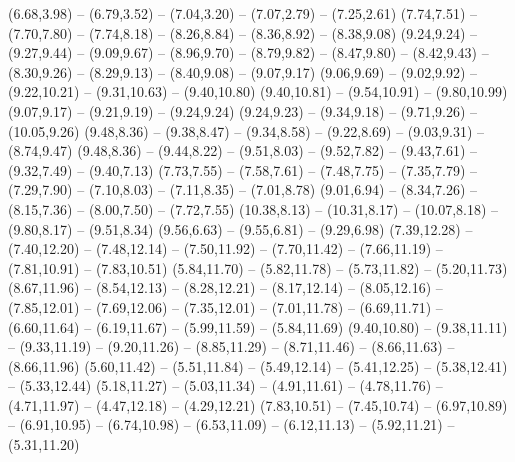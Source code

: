 \expandafter\def\csname geo:Autobahn:A9\endcsname{
  (6.68,3.98) -- (6.79,3.52) -- (7.04,3.20) -- (7.07,2.79) -- (7.25,2.61)
  (7.74,7.51) -- (7.70,7.80) -- (7.74,8.18) -- (8.26,8.84) -- (8.36,8.92) -- (8.38,9.08)}
\expandafter\def\csname geo:Autobahn:A10\endcsname{
  (9.24,9.24) -- (9.27,9.44) -- (9.09,9.67) -- (8.96,9.70) -- (8.79,9.82) -- (8.47,9.80) -- (8.42,9.43) -- (8.30,9.26) -- (8.29,9.13) -- (8.40,9.08) -- (9.07,9.17)}
\expandafter\def\csname geo:Autobahn:A11\endcsname{
  (9.06,9.69) -- (9.02,9.92) -- (9.22,10.21) -- (9.31,10.63) -- (9.40,10.80)
  (9.40,10.81) -- (9.54,10.91) -- (9.80,10.99)}
\expandafter\def\csname geo:Autobahn:A12\endcsname{
  (9.07,9.17) -- (9.21,9.19) -- (9.24,9.24)
  (9.24,9.23) -- (9.34,9.18) -- (9.71,9.26) -- (10.05,9.26)}
\expandafter\def\csname geo:Autobahn:A13\endcsname{
  (9.48,8.36) -- (9.38,8.47) -- (9.34,8.58) -- (9.22,8.69) -- (9.03,9.31) -- (8.74,9.47)
  (9.48,8.36) -- (9.44,8.22) -- (9.51,8.03) -- (9.52,7.82) -- (9.43,7.61) -- (9.32,7.49) -- (9.40,7.13)}
\expandafter\def\csname geo:Autobahn:A14\endcsname{
  (7.73,7.55) -- (7.58,7.61) -- (7.48,7.75) -- (7.35,7.79) -- (7.29,7.90) -- (7.10,8.03) -- (7.11,8.35) -- (7.01,8.78)
  (9.01,6.94) -- (8.34,7.26) -- (8.15,7.36) -- (8.00,7.50) -- (7.72,7.55)}
\expandafter\def\csname geo:Autobahn:A15\endcsname{
  (10.38,8.13) -- (10.31,8.17) -- (10.07,8.18) -- (9.80,8.17) -- (9.51,8.34)}
\expandafter\def\csname geo:Autobahn:A17\endcsname{
  (9.56,6.63) -- (9.55,6.81) -- (9.29,6.98)}
\expandafter\def\csname geo:Autobahn:A19\endcsname{
  (7.39,12.28) -- (7.40,12.20) -- (7.48,12.14) -- (7.50,11.92) -- (7.70,11.42) -- (7.66,11.19) -- (7.81,10.91) -- (7.83,10.51)}
\expandafter\def\csname geo:Autobahn:A20\endcsname{
  (5.84,11.70) -- (5.82,11.78) -- (5.73,11.82) -- (5.20,11.73)
  (8.67,11.96) -- (8.54,12.13) -- (8.28,12.21) -- (8.17,12.14) -- (8.05,12.16) -- (7.85,12.01) -- (7.69,12.06) -- (7.35,12.01) -- (7.01,11.78) -- (6.69,11.71) -- (6.60,11.64) -- (6.19,11.67) -- (5.99,11.59) -- (5.84,11.69)
  (9.40,10.80) -- (9.38,11.11) -- (9.33,11.19) -- (9.20,11.26) -- (8.85,11.29) -- (8.71,11.46) -- (8.66,11.63) -- (8.66,11.96)}
\expandafter\def\csname geo:Autobahn:A21\endcsname{
  (5.60,11.42) -- (5.51,11.84) -- (5.49,12.14) -- (5.41,12.25) -- (5.38,12.41) -- (5.33,12.44)}
\expandafter\def\csname geo:Autobahn:A23\endcsname{
  (5.18,11.27) -- (5.03,11.34) -- (4.91,11.61) -- (4.78,11.76) -- (4.71,11.97) -- (4.47,12.18) -- (4.29,12.21)}
\expandafter\def\csname geo:Autobahn:A24\endcsname{
  (7.83,10.51) -- (7.45,10.74) -- (6.97,10.89) -- (6.91,10.95) -- (6.74,10.98) -- (6.53,11.09) -- (6.12,11.13) -- (5.92,11.21) -- (5.31,11.20)}
